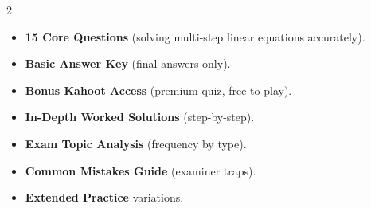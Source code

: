 \documentclass[11pt,a4paper]{article}
\newcommand{\FullReleaseDate}{April 30, 2026}
\begin{document}
\vspace{8pt}

\begin{multicols}{2}
  \begin{tcolorbox}[card, title=\sffamily\bfseries\textcolor{white}{\faHandPointDown\ TODAY (Simplified Version)}, colbacktitle=mainblue, boxed title style={sharp corners, boxrule=0pt}]
    \begin{itemize}[leftmargin=1.2em, itemsep=2pt]
      \item \small \textbf{15 Core Questions} (solving multi-step linear equations accurately).
      \item \small \textbf{Basic Answer Key} (final answers only).
      \item \small \textbf{Bonus Kahoot Access} (premium quiz, free to play).
    \end{itemize}
  \end{tcolorbox}

  \columnbreak

  \begin{tcolorbox}[card, title=\sffamily\bfseries\textcolor{white}{\faRocket\ ON \FullReleaseDate\ (Full Upgrade)}, colbacktitle=mainblue, boxed title style={sharp corners, boxrule=0pt}]
    \begin{itemize}[leftmargin=1.2em, itemsep=2pt]
      \item \small \textbf{In-Depth Worked Solutions} (step-by-step).
      \item \small \textbf{Exam Topic Analysis} (frequency by type).
      \item \small \textbf{Common Mistakes Guide} (examiner traps).
      \item \small \textbf{Extended Practice} variations.
    \end{itemize}
  \end{tcolorbox}
\end{multicols}
\end{document}
